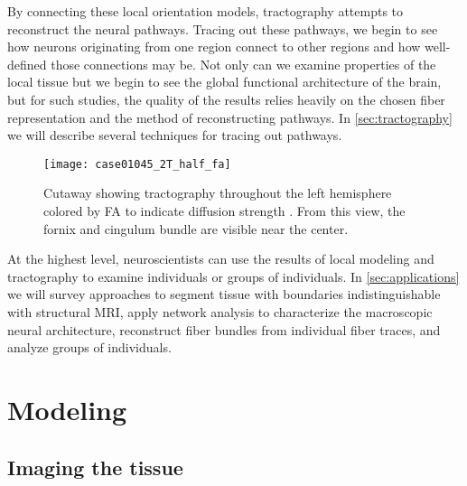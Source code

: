 \documentclass[final,hyperref]{gatech-thesis}
\begin{document}
By connecting these local orientation models, tractography attempts to
reconstruct the neural pathways.  Tracing out these pathways, we begin to see
how neurons originating from one region connect to other regions and how
well-defined those connections may be.  Not only can we examine properties of
the local tissue but we begin to see the global functional architecture of the
brain, but for such studies, the quality of the results relies heavily on the
chosen fiber representation and the method of reconstructing pathways.
%
In \autoref{sec:tractography} we will describe several techniques for tracing
out pathways.

\begin{figure}[t]
  \centering
  \texttt{[image: case01045\_2T\_half\_fa]}%
 \caption{Cutaway showing tractography throughout the left hemisphere colored
   by FA to indicate diffusion strength \cite{malcolm2009ipmi}.  From this
   view, the fornix and cingulum bundle are visible near the center.}
  \label{fig:rh_fa}
\end{figure}




At the highest level, neuroscientists can use the results of local modeling
and tractography to examine individuals or groups of individuals.
%
In \autoref{sec:applications} we will survey approaches to segment tissue with
boundaries indistinguishable with structural MRI, apply network analysis to
characterize the macroscopic neural architecture, reconstruct fiber bundles
from individual fiber traces, and analyze groups of individuals.




\section{Modeling} \label{sec:modeling}

\subsection{Imaging the tissue}
\end{document}
